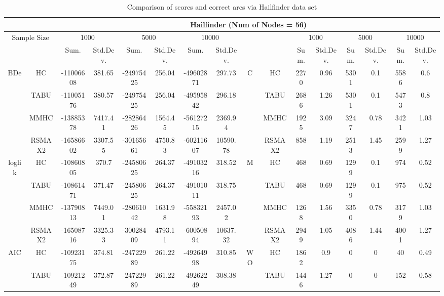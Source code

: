 \begin{table}[p]																										
\centering	\caption{Comparison of scores and correct arcs via Hailfinder data set}	\tiny																						
{\tabcolsep=0.01in																										
\begin{tabular}{cc||cc|cc|cc||cc|cc|cc|cc}																										
\hline																										
&	&	\multicolumn{14}{c}{Hailfinder	(Num	of	Nodes	=	56)}\tabularnewline																			
\hline																										
\multicolumn{2}{c||}{Sample	Size}	&	\multicolumn{2}{c|}{1000}	&	\multicolumn{2}{c|}{5000}	&	\multicolumn{2}{c||}{10000}	&	&	&	\multicolumn{2}{c|}{1000}	&	\multicolumn{2}{c|}{5000}	&	\multicolumn{2}{c}{10000}\tabularnewline											
\hline																										
&	&	Sum.	&	Std.Dev.	&	Sum.	&	Std.Dev.	&	Sum.	&	Std.Dev.	&	&	&	Sum.	&	Std.Dev.	&	Sum.	&	Std.Dev.	&	Sum.	&	Std.Dev.\tabularnewline
\hline																										
\hline																										
\multirow{4}{*}{BDe} & HC &	-11006608 & 	381.65 & 	-24975425 & 	256.04 & 	-49602871 & 	297.73 & 	\multirow{4}{*}{C} & HC &	2270 & 	0.96 & 	5301 & 	0.1 & 	5586 & 	0.6\tabularnewline													
& TABU &	-11005176 & 	380.57 & 	-24975425 & 	256.04 & 	-49595842 & 	296.18 & 	& TABU &	2686 & 	1.26 & 	5301 & 	0.1 & 	5473 & 	0.8\tabularnewline													
& MMHC &	-13885378 & 	7417.41 & 	-28286426 & 	1564.45 & 	-56127215 & 	2369.94 & 	& MMHC &	1925 & 	3.09 & 	3247 & 	0.78 & 	3421 & 	1.03\tabularnewline													
& RSMAX2 &	-16586602 & 	3307.55 & 	-30165661 & 	4750.83 & 	-60211607 & 	10590.78 & 	& RSMAX2 &	858 & 	1.19 & 	2513 & 	1.45 & 	2599 & 	1.27\tabularnewline													
\hline																										
\multirow{4}{*}{loglik} & HC &	-10860805 & 	370.7 & 	-24580625 & 	264.37 & 	-49103216 & 	318.52 & 	\multirow{4}{*}{M} & HC &	468 & 	0.69 & 	1299 & 	0.1 & 	974 & 	0.52\tabularnewline													
& TABU &	-10861471 & 	371.47 & 	-24580625 & 	264.37 & 	-49101011 & 	318.75 & 	& TABU &	468 & 	0.69 & 	1299 & 	0.1 & 	975 & 	0.52\tabularnewline													
& MMHC &	-13790813 & 	7449.01 & 	-28061042 & 	1631.98 & 	-55832193 & 	2457.02 & 	& MMHC &	1268 & 	1.56 & 	3350 & 	0.78 & 	3179 & 	1.03\tabularnewline													
& RSMAX2 &	-16508716 & 	3325.33 & 	-30028409 & 	4793.11 & 	-60050894 & 	10637.32 & 	& RSMAX2 &	2949 & 	1.05 & 	4086 & 	1.44 & 	4001 & 	1.27\tabularnewline													
\hline																										
\multirow{4}{*}{AIC} & HC &	-10923175 & 	374.81 & 	-24722989 & 	261.22 & 	-49264998 & 	310.85 & 	\multirow{4}{*}{WO} & HC &	1862 & 	0.9 & 	0 & 	0 & 	40 & 	0.49\tabularnewline													
& TABU &	-10921249 & 	372.87 & 	-24722989 & 	261.22 & 	-49262249 & 	308.38 & 	& TABU &	1446 & 	1.27 & 	0 & 	0 & 	152 & 	0.58\tabularnewline													

\end{tabular}}
\end{table}
